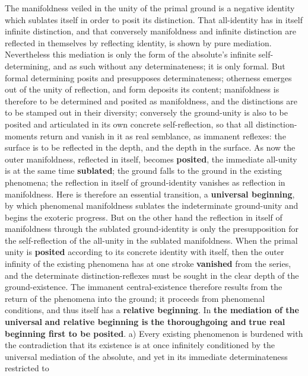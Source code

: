 \documentclass[12pt,a4paper,openany]{book}
\newcommand{\opage}[1]{\marginnote{\footnotesize\textit{[#1]}}}
\begin{document}
The manifoldness veiled in the unity of the primal ground
is a negative identity which sublates itself in order to
posit its distinction. That all-identity has in itself infinite
distinction, and that conversely manifoldness and infinite
distinction are reflected in themselves by reflecting identity,
is shown by pure mediation. Nevertheless this
mediation is only the form of the absolute's infinite
self-determining, and as such without any determinateness;
it is only formal. But formal determining posits
and presupposes determinateness; otherness emerges out of
the unity of reflection, and form deposits its content;
manifoldness is therefore to be determined and posited as
manifoldness, and the distinctions are to be stamped out in their diversity;
conversely the ground-unity is also to be posited
and articulated in its own concrete self-reflection, so that
all distinction-moments return and vanish in
\setcounter{footnote}{0}%
\opage{165}it as real semblance, as immanent reflexes: the surface
is to be reflected in the depth, and the depth in the surface.
As now the outer manifoldness, reflected in itself,
becomes \textbf{posited}, the immediate
all-unity is at the same time \textbf{sublated}; the ground falls to the ground in the existing phenomena; the reflection in itself of ground-identity
vanishes as reflection in manifoldness. Here
is therefore an essential transition, a \textbf{universal beginning},
by which phenomenal manifoldness sublates
the indeterminate ground-unity and begins the exoteric
progress. But on the other hand the reflection
in itself of manifoldness through the sublated
ground-identity is only the presupposition for the self-reflection of the all-unity
in the sublated manifoldness. When the primal unity
is \textbf{posited} according to its concrete identity with itself,
then the outer infinity of the existing phenomena
has at one stroke \textbf{vanished} from the series, and the determinate
distinction-reflexes must be sought in the clear
depth of the ground-existence. The immanent central-existence therefore results
from the return of the phenomena into the ground; it proceeds
from phenomenal conditions, and thus itself has
a \textbf{relative beginning}. In \textbf{the mediation of the
universal} \textbf{and relative beginning is} \textbf{the
thoroughgoing and} \textbf{true real beginning first to be posited}.
a) Every existing phenomenon is burdened with the
contradiction that its existence is at once infinitely conditioned by the universal mediation of the absolute,
and yet in its immediate determinateness restricted to
\end{document}
